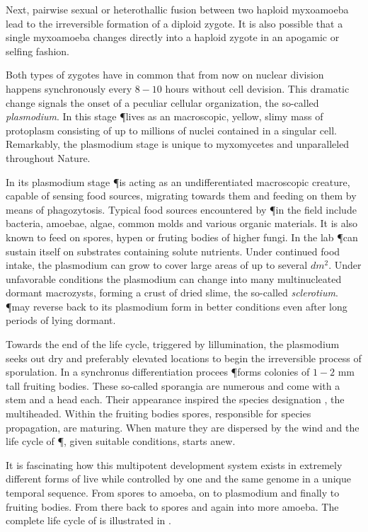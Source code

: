 		Next, pairwise sexual or heterothallic fusion between two haploid myxoamoeba lead to the irreversible formation of a diploid zygote. It is also possible that a single myxoamoeba changes directly into a haploid zygote in an apogamic or selfing fashion.

		Both types of zygotes have in common that from now on nuclear division happens synchronously every $8-10$ hours without cell devision. This dramatic change signals the onset of a peculiar cellular organization, the so-called \emph{plasmodium}. In this stage \P lives as an macroscopic, yellow, slimy mass of protoplasm consisting of up to millions of nuclei contained in a singular cell. Remarkably, the plasmodium stage is unique to myxomycetes and unparalleled throughout Nature.

		In its plasmodium stage \P is acting as an undifferentiated macroscopic creature, capable of sensing food sources, migrating towards them and feeding on them by means of phagozytosis. Typical food sources encountered by \P in the field include bacteria, amoebae, algae, common molds and various organic materials. It is also known to feed on spores, hypen or fruting bodies of higher fungi. In the lab \P can sustain itself on substrates containing solute nutrients. Under continued food intake, the plasmodium can grow to cover large areas of up to  several $dm^2$. Under unfavorable conditions the plasmodium can change into many multinucleated dormant macrozysts, forming a crust of dried slime, the so-called \emph{sclerotium}. \P may reverse back to its plasmodium form in better conditions even after long periods of lying dormant.

		Towards the end of the life cycle, triggered by lillumination, the plasmodium seeks out dry and preferably elevated locations to begin the irreversible process of sporulation. In a synchronus differentiation procees \P forms colonies of $1-2$ mm tall fruiting bodies. These so-called sporangia are numerous and come with a stem and a head each. Their appearance inspired the species designation \Pp, the multiheaded. Within the fruiting bodies spores, responsible for species propagation, are maturing. When mature they are dispersed by the wind and the life cycle of \P, given suitable conditions, starts anew.

		It is fascinating how this multipotent development system exists in extremely different forms of live while controlled by one and the same genome in a unique temporal sequence. From spores to amoeba, on to plasmodium and finally to fruiting bodies. From there back to spores and again into more amoeba. The complete life cycle of \Pp is illustrated in .


